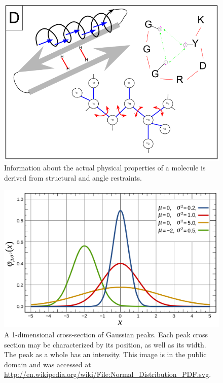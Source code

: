 \begin{figure}
  \includegraphics[scale=0.5]{figures/data_overview_4}
  \caption[Information about the actual physical properties of a molecule.]
          {Information about the actual physical properties of a molecule
           is derived from structural and angle restraints.}
  \label{data_overview_4}
\end{figure}

\begin{figure}
  \includegraphics[scale=0.35]{figures/peak_1d}
  \caption[A 1-dimensional cross-section of Gaussian peaks.]
          {A 1-dimensional cross-section of Gaussian peaks.
           Each peak cross section may be characterized by its 
           position, as well as its width.  The peak as a whole
           has an intensity.  This image is in the
           public domain and was accessed at 
           \url{http://en.wikipedia.org/wiki/File:Normal_Distribution_PDF.svg}.}
  \label{peak_1d}
\end{figure}

